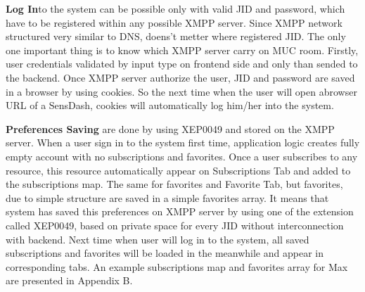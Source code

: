 \textbf{Log In}to the system can be possible only with valid JID and password, which have to be registered within any possible XMPP server. Since XMPP network structured very similar to DNS, doens't metter where registered JID. The only one important thing is to know which XMPP server carry on MUC room. Firstly, user credentials validated by input type on frontend side and only than sended to the backend. Once XMPP server authorize the user, JID and password are saved in a browser by using cookies. So the next time when the user will open abrowser URL of a SensDash, cookies will automatically log him/her into the system. 

\textbf{Preferences Saving} are done by using XEP0049 and stored on the XMPP server. When a user sign in to the system first time, application logic creates fully empty account with no subscriptions and favorites. Once a user subscribes to any resource, this resource automatically appear on Subscriptions Tab and added to the subscriptions map. The same for favorites and Favorite Tab, but favorites, due to simple structure are saved in a simple favorites array. It means that system has saved this preferences on XMPP server by using one of the extension called XEP0049, based on private space for every JID without interconnection with backend. Next time when user will log in to the system, all saved subscriptions and favorites will be loaded in the meanwhile and appear in corresponding tabs. An example subscriptions map and favorites array for Max are presented in Appendix B.

